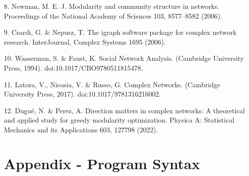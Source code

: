 \documentclass{article}
\begin{document}
8. Newman, M. E. J. Modularity and community structure in networks.
Proceedings of the National Academy of Sciences 103, 8577--8582 (2006).

9. Csardi, G. \& Nepusz, T. The igraph software package for complex
network research. InterJournal, Complex Systems 1695 (2006).

10. Wasserman, S. \& Faust, K. Social Network Analysis. (Cambridge
University Press, 1994). doi:10.1017/CBO9780511815478.

11. Latora, V., Nicosia, V. \& Russo, G. Complex Networks. (Cambridge
University Press, 2017). doi:10.1017/9781316216002.

12. Dugué, N. \& Perez, A. Direction matters in complex networks: A
theoretical and applied study for greedy modularity optimization.
Physica A: Statistical Mechanics and its Applications 603, 127798
(2022).


\newpage

\section{Appendix - Program Syntax}\label{appendix---program-syntax}
\end{document}
